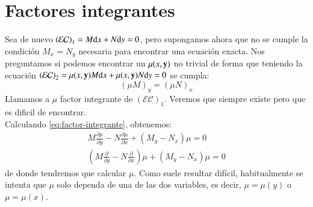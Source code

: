 \section{Factores integrantes}
Sea de nuevo $\mathcal{(EC)}_1 = M \mathrm{d} x + N\mathrm{d} y = 0$, pero supongamos ahora que no se cumple la condición $M_x = N_y$ necesaria para encontrar una ecuación exacta. Nos preguntamos si podemos encontrar un $\mu(x, \mathbf{y})$ no trivial de forma que teniendo la ecuación $\mathcal{(EC)}_2 = \mu(x, \mathbf{y}) M \mathrm{d} x + \mu(x, \mathbf{y}) N\mathrm{d} y = 0$ se cumpla:
\begin{equation}\label{eq:factor-integrante}
    (\mu M)_y = (\mu N)_x
\end{equation}
Llamamos a $\mu$ factor integrante de $\mathcal{(EC)}_1$. Veremos que siempre existe pero que es dificil de encontrar.\\
Calculando \ref{eq:factor-integrante}, obtenemos:
\begin{gather*}
    M \frac{\partial \mu}{\partial y} - N \frac{\partial \mu}{\partial x} + (M_y - N_x) \mu = 0\\
    \left(M \frac{\partial}{\partial y} - N \frac{\partial}{\partial x}\right)\mu + (M_y - N_x) \mu = 0
\end{gather*}
de donde tendremos que calcular $\mu$. Como suele resultar difícil, habitualmente se intenta que $\mu$ solo dependa de una de las dos variables, es decir, $\mu=\mu(y)$ o $\mu=\mu(x)$.
